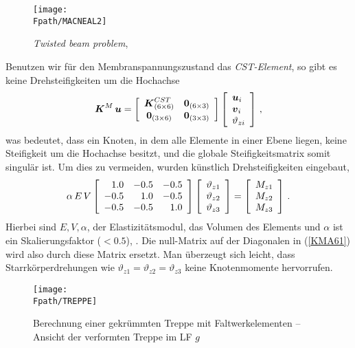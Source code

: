 \begin{figure}[tbp] \centering
\if {} \sidecaption \fi
\texttt{[image: \\Fpath/MACNEAL2]}
\caption{{\em Twisted beam problem\/}, \protect \cite{MacNeal}}  \label{MacNeal2}
\end{figure}%

Benutzen wir f\"{u}r den Membranspannungszustand das {\em CST-Element\/}, so gibt es keine
Drehsteifigkeiten um die Hochachse
\begin{align}\label{KMA61}
\vek K^M\,\vek u = \left[ \barr {c c} \vek K_{(6 \times 6)}^{CST} & \vek 0_{(6 \times 3)} \\
\vek 0_{(3 \times 6)} & \vek 0_{(3 \times 3)} \earr \right] \left[\barr {l} \vek u_i \\ \vek v_i \\
\vartheta_{zi} \earr \right]\,,
\end{align}
was bedeutet, dass ein Knoten, in dem alle Elemente in einer Ebene liegen, keine Steifigkeit um die Hochachse besitzt, und die globale Steifigkeitsmatrix somit singul\"{a}r ist. Um dies zu vermeiden, wurden k\"{u}nstlich Drehsteifigkeiten eingebaut,
\begin{align}
\alpha\,E\,V \left[\barr {r r r} 1.0 & -0.5 &-0.5 \\ -0.5 & 1.0 & -0.5 \\ -0.5 & -0.5 &
1.0 \earr \right]  \left[\barr {l} \vartheta_{z1} \\ \vartheta_{z2} \\
\vartheta_{z3} \earr \right] =  \left[\barr {l} M_{z1} \\ M_{z2} \\
M_{z3}  \earr \right]\,.
\end{align}
Hierbei sind $E, V, \alpha$, der Elastizit\"{a}tsmodul, das Volumen des Elements und $\alpha$ ist ein Skalierungsfaktor ($< 0.5$), \cite{Z1}. Die null-Matrix auf der Diagonalen in (\ref{KMA61}) wird also durch diese Matrix ersetzt. Man \"{u}berzeugt sich leicht, dass Starrk\"{o}rperdrehungen wie $\vartheta_{z1} = \vartheta_{z2} = \vartheta_{z3}$ keine Knotenmomente hervorrufen.
\begin{figure}[h]
\if {} \sidecaption \fi
\texttt{[image: \\Fpath/TREPPE]}
\caption{{Berechnung einer gekr\"{u}mmten Treppe mit Faltwerkelementen -- Ansicht der
verformten Treppe im LF $g$}}\label{Treppe}
\end{figure}


